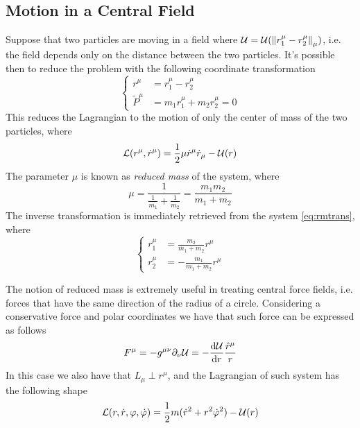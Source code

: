 \documentclass[../admech.tex]{subfiles}
\begin{document}
\subsection{Motion in a Central Field}
\begin{dfn}
	Suppose that two particles are moving in a field where $\mathcal{U}=\mathcal{U}(\norm{r_1^\mu-r_2^\mu}_\mu)$, i.e. the field depends only on the distance between the two particles. It's possible then to reduce the problem with the following coordinate transformation
	\begin{equation}
		\left\{ \begin{aligned}
			r^\mu&=r^\mu_1-r_2^\mu\\
			\tilde{P}^\mu&=m_1r^\mu_1+m_2r^\mu_2=0
		\end{aligned}\right.
		\label{eq:rmtrans}
	\end{equation}
	This reduces the Lagrangian to the motion of only the center of mass of the two particles, where
	\begin{equation*}
		\mathcal{L}(r^\mu,\dot{r}^\mu)=\frac{1}{2}\mu \dot{r}^\mu\dot{r}_\mu-\mathcal{U}(r)
	\end{equation*}
	The parameter $\mu$ is known as \emph{reduced mass} of the system, where
	\begin{equation*}
		\mu=\frac{1}{\frac{1}{m_1}+\frac{1}{m_2}}=\frac{m_1m_2}{m_1+m_2}
	\end{equation*}
	The inverse transformation is immediately retrieved from the system \eqref{eq:rmtrans}, where
	\begin{equation*}
		\left\{ \begin{aligned}
				r^\mu_1&=\frac{m_2}{m_1+m_2}r^\mu\\
				r^\mu_2&=-\frac{m_1}{m_1+m_2}r^\mu
		\end{aligned}\right.
	\end{equation*}
\end{dfn}
The notion of reduced mass is extremely useful in treating central force fields, i.e. forces that have the same direction of the radius of a circle. Considering a conservative force and polar coordinates we have that such force can be expressed as follows
\begin{equation*}
	F^\mu=-g^{\mu\nu}\partial_\nu\mathcal{U}=-\dv{\mathcal{U}}{r}\frac{\hat{r}^\mu}{r}
\end{equation*}
In this case we also have that $L_\mu\perp r^\mu$, and the Lagrangian of such system has the following shape
\begin{equation*}
	\mathcal{L}(r,\dot{r},\varphi,\dot{\varphi})=\frac{1}{2}m(\dot{r}^2+r^2\dot{\varphi}^2)-\mathcal{U}(r)
\end{equation*}
\end{document}
